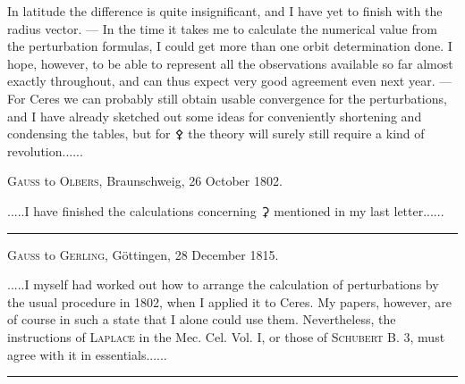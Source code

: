 \par
\noindent\hspace*{\parindent}In latitude the difference is quite insignificant, and I have yet to finish with the radius vector. — In the time it takes me to calculate the numerical value from the perturbation formulas, I could get more than one orbit determination done. I hope, however, to be able to represent all the observations available so far almost exactly throughout, and can thus expect very good agreement even next year. — For Ceres we can probably still obtain usable convergence for the perturbations, and I have already sketched out some ideas for conveniently shortening and condensing the tables, but for {\AstroSymbols ⚴} the theory will surely still require a kind of revolution.\quad.\quad.\quad.\quad.\quad.
\par\bigskip
\begin{center}\textsc{Gauss} to \textsc{Olbers}, Braunschweig, 26 October 1802.\end{center}
\noindent\hspace*{\parindent}.\quad.\quad.\quad.\quad.\quad I have finished the calculations concerning {\AstroSymbols ⚳} mentioned in my last letter.\quad.\quad.\quad.\quad.\quad.
\par\medskip
\begin{center}\rule{.27\linewidth}{.4pt}\end{center}
\par\bigskip
{}
\begin{center}\textsc{Gauss} to \textsc{Gerling}, Göttingen, 28 December 1815.\end{center}
\noindent\hspace*{\parindent}.\quad.\quad.\quad.\quad.\quad I myself had worked out how to arrange the calculation of perturbations by the usual procedure in 1802, when I applied it to Ceres. My papers, however, are of course in such a state that I alone could use them. Nevertheless, the instructions of \textsc{Laplace} in the Mec. Cel. Vol. I, or those of \textsc{Schubert} B. 3, must agree with it in essentials.\quad.\quad.\quad.\quad.\quad.
\par\medskip
\begin{center}\rule{.27\linewidth}{.4pt}\end{center}
